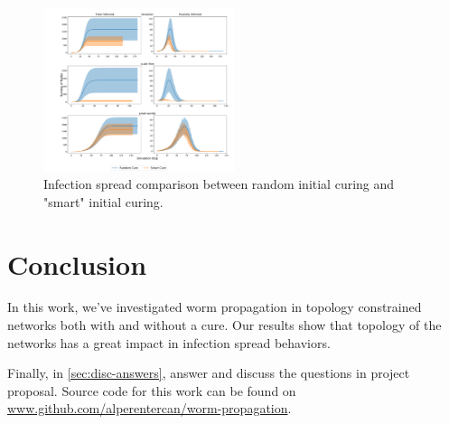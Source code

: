 \documentclass[conference]{IEEEtran}
\begin{document}
\begin{figure}[htb]
  \begin{center}
	\includegraphics[width=0.5\textwidth]{img/smartcure-randomcure.pdf}
  \end{center}
	\caption{Infection spread comparison between random initial curing and "smart" initial curing.}
	\label{fig:smartcure-randomcure}
\end{figure}


\section{Conclusion}

In this work, we've investigated worm propagation in topology constrained networks both with and without a cure. Our results show that topology of the networks has a great impact in infection spread behaviors.

Finally, in \autoref{sec:disc-answers}, answer and discuss the questions in project proposal. Source code for this work can be found on \url{www.github.com/alperentercan/worm-propagation}.





\end{document}
